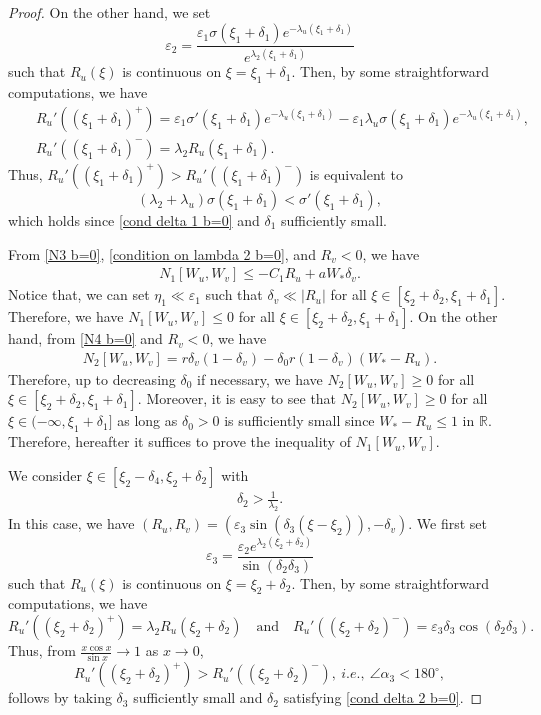 \documentclass[11pt,a4paper]{article}
\numberwithin{equation}{section}
\numberwithin{figure}{section}
\newcommand\bea{\begin{eqnarray}}
\newcommand\eea{\end{eqnarray}}
\newcommand\beaa{\begin{eqnarray*}}
\newcommand\eeaa{\end{eqnarray*}}
\begin{document}
\begin{proof}
On the other hand, we set
$$\varepsilon_2=\frac{\varepsilon_1\sigma(\xi_1+\delta_1)e^{-\lambda_u(\xi_1+\delta_1)}}{e^{\lambda_2(\xi_1+\delta_1)}}$$
such that $R_u(\xi)$ is continuous on $\xi=\xi_1+\delta_1$. Then, by some straightforward computations, we have
\beaa
&&R_u'((\xi_1+\delta_1)^+)=\varepsilon_1\sigma'(\xi_1+\delta_1)e^{-\lambda_u(\xi_1+\delta_1)}-\varepsilon_1\lambda_u\sigma(\xi_1+\delta_1)e^{-\lambda_u(\xi_1+\delta_1)},\\
&&R_u'((\xi_1+\delta_1)^-)=\lambda_2R_u(\xi_1+\delta_1).
\eeaa
Thus, $R_u'((\xi_1+\delta_1)^+)>R_u'((\xi_1+\delta_1)^-)$ %
is
equivalent to
$$(\lambda_2+\lambda_u)\sigma(\xi_1+\delta_1)<\sigma'(\xi_1+\delta_1),$$
which holds %
since
\eqref{cond delta 1 b=0} and $\delta_1$ sufficiently small.


From \eqref{N3 b=0}, \eqref{condition on lambda 2 b=0}, and $R_v<0$, we have
\beaa
N_1[W_u,W_v]\le-C_1R_u+aW_*\delta_v.
\eeaa
Notice that, we can set $\eta_1\ll \varepsilon_1$ such that $\delta_v\ll|R_u|$ for all $\xi\in[\xi_2+\delta_2,\xi_1+\delta_1]$. Therefore, we have $N_1[W_u,W_v]\le 0$ for all $\xi\in[\xi_2+\delta_2,\xi_1+\delta_1]$.
On the other hand, from \eqref{N4 b=0} and $R_v<0$, we have
\beaa
N_2[W_u,W_v]=r\delta_v(1-\delta_v)-\delta_0r(1-\delta_v)(W_*-R_u).
\eeaa
Therefore, up to decreasing $\delta_0$ if necessary, we have $N_2[W_u,W_v]\ge 0$ for all
$\xi\in[\xi_2+\delta_2,\xi_1+\delta_1]$. Moreover, it is easy to see that $N_2[W_u,W_v]\ge 0$ for all $\xi\in(-\infty,\xi_1+\delta_1]$ as long as $\delta_0>0$ is sufficiently small since $W_*-R_u\leq 1$ in $\mathbb{R}$. Therefore, hereafter it suffices to prove the inequality of $N_1[W_u,W_v]$.



\medskip

 We consider $\xi\in[\xi_{2}-\delta_4,\xi_2+\delta_2]$ with
\bea\label{cond delta 2 b=0}
\delta_2>\frac{1}{\lambda_2}.
\eea
In this case, we have $(R_u,R_v)=(\varepsilon_3\sin(\delta_3(\xi-\xi_2)),-\delta_v)$. We first set
$$\varepsilon_3=\frac{\varepsilon_2e^{\lambda_2(\xi_2+\delta_2)}}{\sin(\delta_2\delta_3)}$$
such that $R_u(\xi)$ is continuous on $\xi=\xi_2+\delta_2$.
Then, by some straightforward computations, we have
$$R_u'((\xi_2+\delta_2)^+)=\lambda_2R_u(\xi_2+\delta_2)\quad\text{and}\quad R_u'((\xi_2+\delta_2)^-)=\varepsilon_3\delta_3\cos(\delta_2\delta_3).$$
Thus, from $\frac{x\cos x}{\sin x}\to 1$ as $x\to 0$, 
$$R_u'((\xi_2+\delta_2)^+)>R_u'((\xi_2+\delta_2)^-),\ i.e.,\ \angle \alpha_3<180^{\circ},$$ 
follows by taking
$\delta_3$ sufficiently small and $\delta_2$ satisfying \eqref{cond delta 2 b=0}.


\end{proof}
\end{document}
